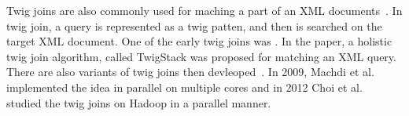 Twig joins are also commonly used for maching a part of an XML
documents~\cite{jiang2003holistic,lu2005efficient,lu2005tjfast,fontoura2005optimizing}.
In twig join, a query is represented as a twig patten, and then is searched on
the target XML document. One of the early twig joins was \cite{BrKS02}. In the
paper, a holistic twig join algorithm, called TwigStack was proposed for
matching an XML query. There are also variants of twig joins then
devleoped~\cite{CLTH06,QiYD07}. In 2009, Machdi et al.~\cite{MaAK09} implemented
the idea in parallel on multiple cores and in 2012 Choi et al.~\cite{CLKL12}
studied the twig joins on Hadoop in a parallel manner.


%
%

